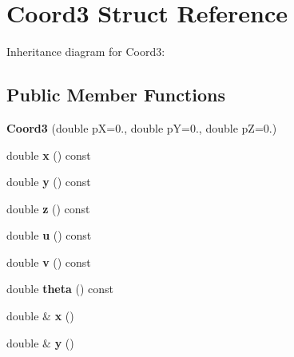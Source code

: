 \hypertarget{structCoord3}{}\section{Coord3 Struct Reference}
\label{structCoord3}


Inheritance diagram for Coord3\+:
\subsection*{Public Member Functions}
\begin{DoxyCompactItemize}
\item 
{\bfseries Coord3} (double pX=0., double pY=0., double pZ=0.)\hypertarget{structCoord3_a46ffc2230d1e19857b2d53a1942585d8}{}\label{structCoord3_a46ffc2230d1e19857b2d53a1942585d8}

\item 
double {\bfseries x} () const \hypertarget{structCoord3_a908a8b923a3fcd944815b8a855075741}{}\label{structCoord3_a908a8b923a3fcd944815b8a855075741}

\item 
double {\bfseries y} () const \hypertarget{structCoord3_a8344dd2432a935abcdecc8539456612b}{}\label{structCoord3_a8344dd2432a935abcdecc8539456612b}

\item 
double {\bfseries z} () const \hypertarget{structCoord3_a4ca4e4983947533ca89d019083127e03}{}\label{structCoord3_a4ca4e4983947533ca89d019083127e03}

\item 
double {\bfseries u} () const \hypertarget{structCoord3_a37606cba32f7a27c6866118daf9ae86c}{}\label{structCoord3_a37606cba32f7a27c6866118daf9ae86c}

\item 
double {\bfseries v} () const \hypertarget{structCoord3_aa6c4d8a507f3912b4c38a291ac68c2a3}{}\label{structCoord3_aa6c4d8a507f3912b4c38a291ac68c2a3}

\item 
double {\bfseries theta} () const \hypertarget{structCoord3_acaa752d4d8094cbf51b59d17b4a66635}{}\label{structCoord3_acaa752d4d8094cbf51b59d17b4a66635}

\item 
double \& {\bfseries x} ()\hypertarget{structCoord3_a52d74542504a77b7ee191d600052d16f}{}\label{structCoord3_a52d74542504a77b7ee191d600052d16f}

\item 
double \& {\bfseries y} ()\hypertarget{structCoord3_a3989c40ed04487fdfb9776085cd913db}{}\label{structCoord3_a3989c40ed04487fdfb9776085cd913db}


\end{DoxyCompactItemize}
